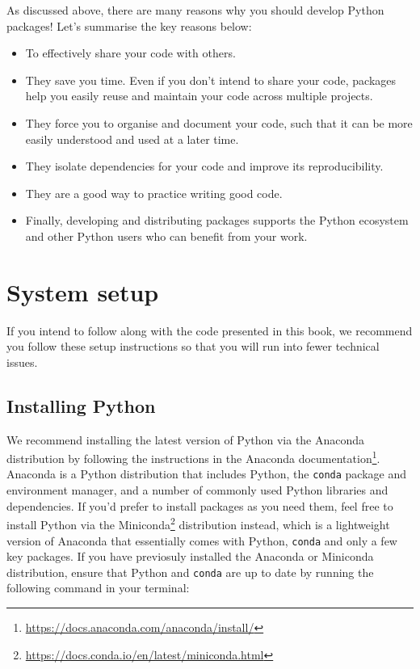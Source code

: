 \documentclass[
]{krantz}
\providecommand{\tightlist}{%
  \setlength{\itemsep}{0pt}\setlength{\parskip}{0pt}}
\renewcommand{\href}[2]{#2\footnote{\url{#1}}}
\begin{document}
As discussed above, there are many reasons why you should develop Python packages! Let's summarise the key reasons below:

\begin{itemize}
\tightlist
\item
  To effectively share your code with others.
\item
  They save you time. Even if you don't intend to share your code, packages help you easily reuse and maintain your code across multiple projects.
\item
  They force you to organise and document your code, such that it can be more easily understood and used at a later time.
\item
  They isolate dependencies for your code and improve its reproducibility.
\item
  They are a good way to practice writing good code.
\item
  Finally, developing and distributing packages supports the Python ecosystem and other Python users who can benefit from your work.
\end{itemize}

\hypertarget{system-setup}{%
\chapter{System setup}\label{system-setup}}

If you intend to follow along with the code presented in this book, we recommend you follow these setup instructions so that you will run into fewer technical issues.

\hypertarget{installing-python}{%
\section{Installing Python}\label{installing-python}}

We recommend installing the latest version of Python via the Anaconda distribution by following the instructions in the \href{https://docs.anaconda.com/anaconda/install/}{Anaconda documentation}. Anaconda is a Python distribution that includes Python, the \texttt{conda} package and environment manager, and a number of commonly used Python libraries and dependencies. If you'd prefer to install packages as you need them, feel free to install Python via the \href{https://docs.conda.io/en/latest/miniconda.html}{Miniconda} distribution instead, which is a lightweight version of Anaconda that essentially comes with Python, \texttt{conda} and only a few key packages. If you have previosuly installed the Anaconda or Miniconda distribution, ensure that Python and \texttt{conda} are up to date by running the following command in your terminal:
\end{document}

